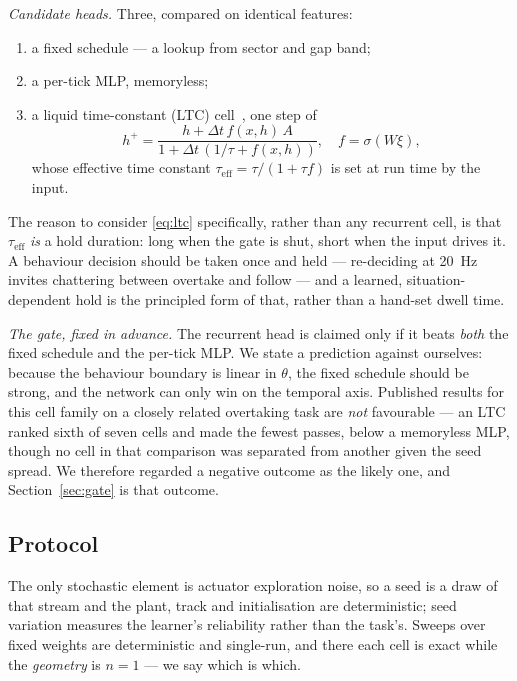 \documentclass[letterpaper, 10 pt, conference]{ieeeconf}
\begin{document}
\emph{Candidate heads.} Three, compared on identical features:
\begin{enumerate}
  \item a fixed schedule --- a lookup from sector and gap band;
  \item a per-tick MLP, memoryless;
  \item a liquid time-constant (LTC) cell~\cite{hasani2021ltc}, one step of
        \begin{equation}
          h^+ = \frac{h + \Delta t\, f(x,h)\,A}{1 + \Delta t\,(1/\tau + f(x,h))},
          \quad f = \sigma(W\xi),
          \label{eq:ltc}
        \end{equation}
        whose effective time constant $\tau_{\text{eff}} = \tau/(1 + \tau f)$ is
        set at run time by the input.
\end{enumerate}

The reason to consider \eqref{eq:ltc} specifically, rather than any recurrent
cell, is that $\tau_{\text{eff}}$ \emph{is} a hold duration: long when the gate
is shut, short when the input drives it. A behaviour decision should be taken
once and held --- re-deciding at \SI{20}{\hertz} invites chattering between
overtake and follow --- and a learned, situation-dependent hold is the
principled form of that, rather than a hand-set dwell time.

\emph{The gate, fixed in advance.} The recurrent head is claimed only if it
beats \emph{both} the fixed schedule and the per-tick MLP. We state a prediction
against ourselves: because the behaviour boundary is linear in $\theta$, the
fixed schedule should be strong, and the network can only win on the temporal
axis. Published results for this cell family on a closely related overtaking
task are \emph{not} favourable --- an LTC ranked sixth of seven cells and made
the fewest passes, below a memoryless MLP, though no cell in that comparison was
separated from another given the seed spread. We therefore regarded a negative
outcome as the likely one, and Section~\ref{sec:gate} is that outcome.

\subsection{Protocol}
The only stochastic element is actuator exploration noise, so a seed is a draw
of that stream and the plant, track and initialisation are deterministic; seed
variation measures the learner's reliability rather than the task's. Sweeps over
fixed weights are deterministic and single-run, and there each cell is exact
while the \emph{geometry} is $n=1$ --- we say which is which.
\end{document}
